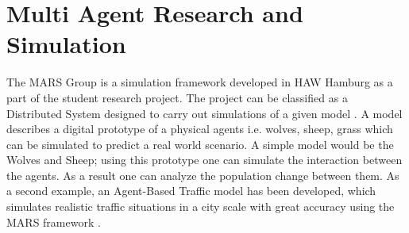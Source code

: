 
\section{Multi Agent Research and Simulation}
        \label{section:MARS}
        The MARS Group is a simulation framework developed 
        in HAW Hamburg as a  part of the student research project. The project can be classified as a
        Distributed System \cite{DistributedSystems} designed to carry out simulations of a given model 
        \cite{HAWHamburgMARS}. 
        A model describes a digital prototype of a physical agents i.e. wolves, sheep, grass 
        which can be simulated to predict a real world scenario. A simple model would
        be the Wolves and Sheep; using this prototype one can simulate the interaction between the agents. 
        As a result one can analyze the population change between them. As a second example, an Agent-Based Traffic
        model has been developed, which simulates realistic traffic situations in a city scale with great accuracy 
        using the MARS framework \cite{TrafficModel}.

        \par
